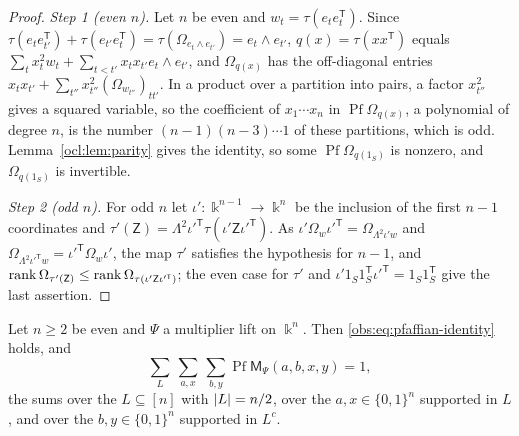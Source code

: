 \begin{proof}
\emph{Step 1 (even $n$).} Let $n$ be even and $w_t=\tau(e_te_t^{\mathsf T})$. Since $\tau(e_te_{t'}^{\mathsf
T})+\tau(e_{t'}e_t^{\mathsf T})=\tau(\Omega_{e_t\wedge e_{t'}})=e_t\wedge e_{t'}$, $q(x)=\tau(xx^{\mathsf T})$ equals
$\sum_tx_t^2w_t+\sum_{t<t'}x_tx_{t'}e_t\wedge e_{t'}$, and $\Omega_{q(x)}$ has the off-diagonal entries
$x_tx_{t'}+\sum_{t''}x_{t''}^2(\Omega_{w_{t''}})_{tt'}$. In a product over a partition into pairs, a factor $x_{t''}^2$
gives a squared variable, so the coefficient of $x_1\cdots x_n$ in $\operatorname{Pf}\Omega_{q(x)}$, a polynomial of
degree $n$, is the number $(n-1)(n-3)\cdots1$ of these partitions, which is odd. Lemma~\ref{ocl:lem:parity} gives the
identity, so some $\operatorname{Pf}\Omega_{q(1_S)}$ is nonzero, and $\Omega_{q(1_S)}$ is invertible.

\emph{Step 2 (odd $n$).} For odd $n$ let $\iota'\colon\Bbbk^{n-1}\to\Bbbk^n$ be the inclusion of the first $n-1$
coordinates and $\tau'(\mathsf Z)=\Lambda^2\iota'^{\mathsf T}\tau(\iota'\mathsf Z\iota'^{\mathsf T})$. As
$\iota'\Omega_w\iota'^{\mathsf T}=\Omega_{\Lambda^2\iota'w}$ and $\Omega_{\Lambda^2\iota'^{\mathsf T}w}=\iota'^{\mathsf
T}\Omega_w\iota'$, the map $\tau'$ satisfies the hypothesis for $n-1$, and $\operatorname{rank}\Omega_{\tau'(\mathsf
Z)}\le\operatorname{rank}\Omega_{\tau(\iota'\mathsf Z\iota'^{\mathsf T})}$; the even case for $\tau'$ and $\iota'1_S1_S^{\mathsf
T}\iota'^{\mathsf T}=1_S1_S^{\mathsf T}$ give the last assertion.
\end{proof}

\begin{proposition}\label{ocl:prop:pfaffian-identity}
Let $n\ge2$ be even and $\Psi$ a multiplier lift on $\Bbbk^n$. Then \eqref{obs:eq:pfaffian-identity} holds, and
\begin{equation}\label{ocl:eq:pfaffian-sum}
\sum_{L}\ \sum_{a,x}\ \sum_{b,y}\operatorname{Pf}\mathsf M_\Psi(a,b,x,y)=1,
\end{equation}
the sums over the $L\subseteq[n]$ with $\lvert L\rvert=n/2$, over the $a,x\in\{0,1\}^n$ supported in $L$, and over the
$b,y\in\{0,1\}^n$ supported in $L^c$.
\end{proposition}

